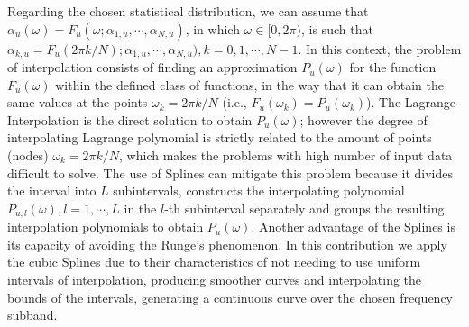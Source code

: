\documentclass[journal]{IEEEtran}
\begin{document}
Regarding the chosen statistical distribution, we can assume that $\alpha_u (\omega) = F_u(\omega; \alpha_{1,u}, \cdots, \alpha_{N,u})$, in which $\omega \in [0,2\pi)$, is such that $\alpha_{k,u} = F_u(2\pi k/N); \alpha_{1,u}, \cdots, \alpha_{N,u}),k=0,1,\cdots,N-1$. In this context, the problem of interpolation consists of finding an approximation $P_u(\omega)$ for the function $F_u(\omega)$ within the defined class of functions, in the way that it can obtain the same values at the points $\omega_k = 2\pi k/N$ (i.e., $F_u(\omega_k)=P_u(\omega_k)$). The Lagrange Interpolation is the direct solution to obtain $P_u(\omega)$; however the degree of interpolating Lagrange polynomial is strictly related to the amount of points (nodes)  $\omega_k = 2\pi k/N$, which makes the problems with high number of input data difficult to solve. The use of Splines can mitigate this problem because it divides the interval into $L$ subintervals, constructs the interpolating polynomial $P_{u,l}(\omega),l=1,\cdots,L$ in the $l$-th subinterval separately and groups the resulting interpolation polynomials to obtain $P_u(\omega)$. Another advantage of the Splines is its capacity of avoiding the Runge's phenomenon. In this contribution we apply the cubic Splines \cite{Spline} due to their characteristics of not needing to use uniform intervals of interpolation, producing smoother curves and interpolating the bounds of the intervals, generating a continuous curve over the chosen frequency subband. 
\end{document}
